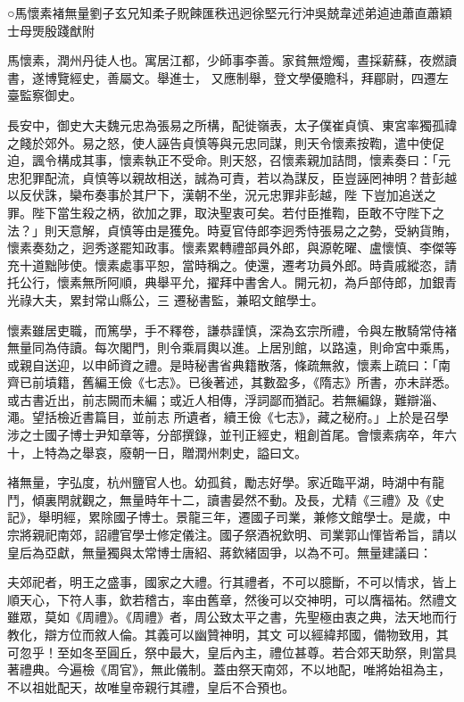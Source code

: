 
\begin{pinyinscope}

 ○馬懷素褚無量劉子玄兄知柔子貺餗匯秩迅迥徐堅元行沖吳兢韋述弟逌迪蕭直蕭穎士母煚殷踐猷附



 馬懷素，潤州丹徒人也。寓居江都，少師事李善。家貧無燈燭，晝採薪蘇，夜燃讀書，遂博覽經史，善屬文。舉進士，
 又應制舉，登文學優贍科，拜郿尉，四遷左臺監察御史。



 長安中，御史大夫魏元忠為張易之所構，配徙嶺表，太子僕崔貞慎、東宮率獨孤禕之餞於郊外。易之怒，使人誣告貞慎等與元忠同謀，則天令懷素按鞫，遣中使促迫，諷令構成其事，懷素執正不受命。則天怒，召懷素親加詰問，懷素奏曰：「元忠犯罪配流，貞慎等以親故相送，誠為可責，若以為謀反，臣豈誣罔神明？昔彭越以反伏誅，欒布奏事於其尸下，漢朝不坐，況元忠罪非彭越，陛
 下豈加追送之罪。陛下當生殺之柄，欲加之罪，取決聖衷可矣。若付臣推鞫，臣敢不守陛下之法？」則天意解，貞慎等由是獲免。時夏官侍郎李迥秀恃張易之之勢，受納貨賄，懷素奏劾之，迥秀遂罷知政事。懷素累轉禮部員外郎，與源乾曜、盧懷慎、李傑等充十道黜陟使。懷素處事平恕，當時稱之。使還，遷考功員外郎。時貴戚縱恣，請托公行，懷素無所阿順，典舉平允，擢拜中書舍人。開元初，為戶部侍郎，加銀青光祿大夫，累封常山縣公，三
 遷秘書監，兼昭文館學士。



 懷素雖居吏職，而篤學，手不釋卷，謙恭謹慎，深為玄宗所禮，令與左散騎常侍褚無量同為侍讀。每次閣門，則令乘肩輿以進。上居別館，以路遠，則命宮中乘馬，或親自送迎，以申師資之禮。是時秘書省典籍散落，條疏無敘，懷素上疏曰：「南齊已前墳籍，舊編王儉《七志》。已後著述，其數盈多，《隋志》所書，亦未詳悉。或古書近出，前志闕而未編；或近人相傳，浮詞鄙而猶記。若無編錄，難辯淄、澠。望括檢近書篇目，並前志
 所遺者，續王儉《七志》，藏之秘府。」上於是召學涉之士國子博士尹知章等，分部撰錄，並刊正經史，粗創首尾。會懷素病卒，年六十，上特為之舉哀，廢朝一日，贈潤州刺史，謚曰文。



 褚無量，字弘度，杭州鹽官人也。幼孤貧，勵志好學。家近臨平湖，時湖中有龍鬥，傾裏閈就觀之，無量時年十二，讀書晏然不動。及長，尤精《三禮》及《史記》，舉明經，累除國子博士。景龍三年，遷國子司業，兼修文館學士。是歲，中
 宗將親祀南郊，詔禮官學士修定儀注。國子祭酒祝欽明、司業郭山惲皆希旨，請以皇后為亞獻，無量獨與太常博士唐紹、蔣欽緒固爭，以為不可。無量建議曰：



 夫郊祀者，明王之盛事，國家之大禮。行其禮者，不可以臆斷，不可以情求，皆上順天心，下符人事，欽若稽古，率由舊章，然後可以交神明，可以膺福祐。然禮文雖眾，莫如《周禮》。《周禮》者，周公致太平之書，先聖極由衷之典，法天地而行教化，辯方位而敘人倫。其義可以幽贊神明，其文
 可以經緯邦國，備物致用，其可忽乎！至如冬至圓丘，祭中最大，皇后內主，禮位甚尊。若合郊天助祭，則當具著禮典。今遍檢《周官》，無此儀制。蓋由祭天南郊，不以地配，唯將始祖為主，不以祖妣配天，故唯皇帝親行其禮，皇后不合預也。




\end{pinyinscope}
